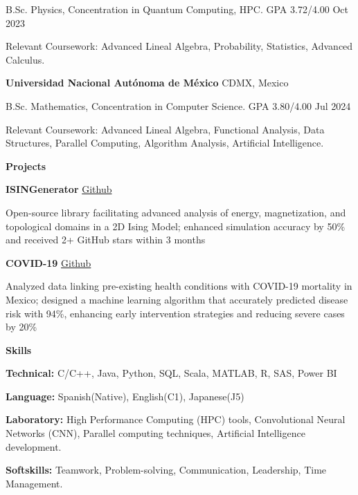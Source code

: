 \documentclass[6pt]{article}
\begin{document}
B.Sc. Physics, Concentration in Quantum Computing, HPC. GPA 3.72/4.00 \hfill Oct 2023

Relevant Coursework: Advanced Lineal Algebra, Probability, Statistics, Advanced Calculus.

\vspace{12pt}

\textbf{Universidad Nacional Autónoma de México} \hfill CDMX, Mexico

B.Sc. Mathematics, Concentration in Computer Science. GPA 3.80/4.00 \hfill Jul 2024

Relevant Coursework: Advanced Lineal Algebra, Functional Analysis, Data Structures, Parallel Computing, Algorithm Analysis, Artificial Intelligence.

\vspace{12pt}
\begin{center}
    \textbf{Projects}
\end{center}
\textbf{ISINGenerator} \hfill \href{https://github.com/erick-rios/ISINGenerator}{Github}

Open-source library facilitating advanced analysis of energy, magnetization, and topological domains in a 2D Ising Model; enhanced simulation accuracy by 50\% and received 2+ GitHub stars within 3 months

\vspace{12pt}

\textbf{COVID-19} \hfill \href{https://github.com/erick-rios/COVID19-erick-rios}{Github}

Analyzed data linking pre-existing health conditions with COVID-19 mortality in Mexico; designed a machine learning algorithm that accurately predicted disease risk with 94\%, enhancing early intervention strategies and reducing severe cases by 20\%

\vspace{12pt}
\begin{center}
    \textbf{Skills}
\end{center}
\textbf{Technical:} C/C++, Java, Python, SQL, Scala, MATLAB, R, SAS, Power BI

\textbf{Language:} Spanish(Native), English(C1), Japanese(J5)

\textbf{Laboratory:} High Performance Computing (HPC) tools, Convolutional Neural Networks (CNN), Parallel computing techniques, Artificial Intelligence development.

\textbf{Softskills:} Teamwork, Problem-solving, Communication, Leadership, Time Management.
\end{document}
